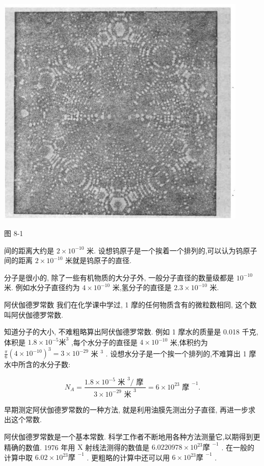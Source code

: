 \documentclass[10pt]{article}
\begin{document}
\begin{center}
\includegraphics[max width=0.9\textwidth]{images/01912d55-147c-70aa-b0e0-1782a122f948_234_552230.jpg}
\end{center}

图 8-1

间的距离大约是 \(2 \times {10}^{-{10}}\) 米. 设想钨原子是一个挨着一个排列的,可以认为钨原子间的距离 \(2 \times {10}^{-{10}}\) 米就是钨原子的直径.

分子是很小的, 除了一些有机物质的大分子外, 一般分子直径的数量级都是 \({10}^{-{10}}\) 米. 例如水分子直径约为 \(4 \times {10}^{-{10}}\) 米,氢分子的直径是 \({2.3} \times {10}^{-{10}}\) 米.

阿伏伽德罗常数 我们在化学课中学过, 1 摩的任何物质含有的微粒数相同, 这个数叫阿伏伽德罗常数.

知道分子的大小, 不难粗略算出阿伏伽德罗常数. 例如 1 摩水的质量是 0.018 千克,体积是 \({1.8} \times {10}^{-5}{\text{米}}^{3}\) ,每个水分子的直径是 \(4 \times {10}^{-{10}}\) 米,体积约为 \(\frac{\pi }{6}{\left( 4 \times {10}^{-{10}}\right) }^{3} = 3 \times {10}^{-{29}}\) 米 \({}^{3}\) . 设想水分子是一个挨一个排列的,不难算出 1 摩水中所含的水分子数:

\[
{N}_{A} = \frac{{1.8} \times {10}^{-5}{\text{ 米 }}^{3}/\text{ 摩 }}{3 \times {10}^{-{29}}{\text{ 米 }}^{3}} = 6 \times {10}^{23}{\text{ 摩 }}^{-1}.
\]

早期测定阿伏伽德罗常数的一种方法, 就是利用油膜先测出分子直径, 再进一步求出这个常数.

阿伏伽德罗常数是一个基本常数. 科学工作者不断地用各种方法测量它,以期得到更精确的数值. 1976 年用 \(\mathrm{X}\) 射线法测得的数值是 \({6.0220978} \times {10}^{23}{\text{摩 }}^{-1}\) . 在一般的计算中取 \({6.02} \times {10}^{23}{\text{摩 }}^{-1}\) . 更粗略的计算中还可以用 \(6 \times {10}^{23}{\text{摩 }}^{-1}\) .
\end{document}
